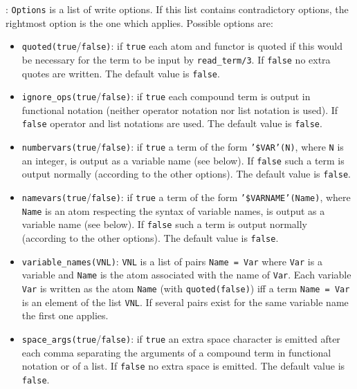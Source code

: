 : \texttt{Options} is a list of write options. If this
list contains contradictory options, the rightmost option is the one which
applies. Possible options are:

\begin{itemize}

\item {}\texttt{quoted(true}/\texttt{false)}: if \texttt{true} each
atom and functor is quoted if this would be necessary for the term to be
input by \texttt{read\_term/3}. If \texttt{false} no extra quotes are
written. The default value is \texttt{false}.

\item {}\texttt{ignore\_ops(true}/\texttt{false)}: if
\texttt{true} each compound term is output in functional notation (neither
operator notation nor list notation is used). If \texttt{false} operator and
list notations are used. The default value is \texttt{false}.

\item {}\texttt{numbervars(true}/\texttt{false)}: if
\texttt{true} a term of the form \texttt{'\$VAR'(N)}, where \texttt{N} is an
integer, is output as a variable name (see below). If \texttt{false}
such a term is output normally (according to the other options). The
default value is \texttt{false}.

\item {}\texttt{namevars(true}/\texttt{false)}: if \texttt{true} a
term of the form \texttt{'\$VARNAME'(Name)}, where \texttt{Name} is an atom 
respecting the syntax of variable names, is output as a variable name (see
below). If \texttt{false} such a term is output normally (according to the
other options). The default value is \texttt{false}.

\item {}\texttt{variable\_names(VNL)}: \texttt{VNL} is
a list of pairs \texttt{Name = Var} where \texttt{Var} is a
variable and \texttt{Name} is the atom associated with the
name of \texttt{Var}. Each variable \texttt{Var} is written as the atom
\texttt{Name} (with \texttt{quoted(false)}) iff a term 
\texttt{Name = Var} is an element of the list \texttt{VNL}.
If several pairs exist for the same variable name the first one applies.

\item {}\texttt{space\_args(true}/\texttt{false)}: if
\texttt{true} an extra space character is emitted after each comma
separating the arguments of a compound term in functional notation or of a
list. If \texttt{false} no extra space is emitted. The default value is
\texttt{false}.


\end{itemize}
